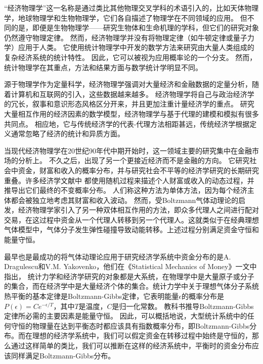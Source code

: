 \documentclass[tsinghuacite]{HustGraduPaper}
\begin{document}
			“经济物理学”这一名称是通过类比其他物理交叉学科的术语引入的，比如天体物理学，地球物理学和生物物理学，它们各自描述了物理学在不同领域的应用。 但不同的是，即便是生物物理学——研究生物体和生命机理的学科，但它们的研究对象仍然遵守物理定律。 然而，经济物理学并没有将物理定律（如牛顿定律或量子力学）应用于人类。 它使用统计物理学中开发的数学方法来研究由大量人类组成的复杂经济系统的统计特性。 因此，它可以被视为应用概率论的一个分支。 然而，统计物理学在其重点，方法和结果方面与数学统计学明显不同。
			
			源于物理学作为定量科学，经济物理学强调对大量经济和金融数据的定量分析，随着计算机和互联网的引入，这些数据越来越多。 经济物理学将自己与政治经济学的冗长，叙事和意识形态风格区分开来，并且更加注重计量经济学的重点。 研究大量相互作用的经济因素的数学模型，经济物理学与基于代理的建模和模拟有很多共同点。 相应地，它与传统经济学的代表-代理方法相距甚远，传统经济学根据定义通常忽略了经济的统计和异质方面。
	
			当现代经济物理学在20世纪90年代中期开始时，这一领域主要的研究集中在金融市场的分析上。 不久之后，出现了另一个更接近经济而不是金融的方向。 它研究社会中资金，财富和收入的概率分布，并与研究社会不平等的经济学研究的长期研究重叠。许多经济学文献中\cite{gibrat1931ingalits}\cite{kalecki1945gibrat} 都使用随机过程来描述个人财富或收入的动态过程，并推导出它们最终的不变概率分布。 人们称这种方法为单体方法，因为每个经济主体都会被独立地考虑其财富和收入波动。 然而，受Boltzmann气体动理论的启发，经济物理学家引入了另一种双体相互作用的方法，即众多代理人之间进行配对交易，在这过程中资金从一个代理人转移到另一个代理人。这就类似于在经典理想气体模型中，气体分子发生弹性碰撞导致动能转移。上述过程分别满足资金守恒和能量守恒。
	
			最早也是最成功的将气体动理论应用于研究经济学系统中资金分布的是A. Dragulescu和V.M. Yakovenko\cite{dragulescu2000statistical}，他们在《Statistical Mechanics of Money》一文中指出， 统计力学和经济学研究的对象都是大系统，在物理学中是大量原子或分子的集合，而在经济学中是大量经济个体的集合。统计力学中关于理想气体分子系统热平衡的基本定律是Boltzmann-Gibbs定律，它表明能量$\epsilon$的概率分布是$P(\epsilon) = C e^{- \epsilon/T}$，其中$T$是温度，$C$是归一化常数\cite{wannier1987statistical}。 教科书推导Boltzmann-Gibbs定律\cite{wannier1987statistical}所必需的主要因素是能量守恒\cite{tsallis1988possible}。 因此，可以概括地说，大型统计系统中的任何守恒的物理量在达到平衡态时都应该具有指数概率分布，即Boltzmann-Gibbs分布\cite{dragulescu2000statistical}。而在理想的经济学系统中，我们可以假定资金在转移过程中始终是守恒的，那么通过这样简单的类比，我们可以推断在这样的经济系统中，平衡时的资金分布应该同样满足Boltzmann-Gibbs分布。
\end{document}
